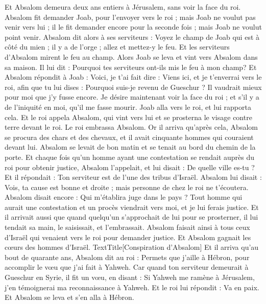 \begin{multicols}{2}
Et Absalom demeura deux ans entiers à Jérusalem, sans voir la face du roi.
Absalom fit demander Joab, pour l'envoyer vers le roi ; mais Joab ne voulut pas venir vers lui ; il le fit demander encore pour la seconde fois ; mais Joab ne voulut point venir.
Absalom dit alors à ses serviteurs : Voyez le champ de Joab qui est à côté du mien ; il y a de l'orge ; allez et mettez-y le feu. Et les serviteurs d'Absalom mirent le feu au champ.
Alors Joab se leva et vint vers Absalom dans sa maison. Il lui dit : Pourquoi tes serviteurs ont-ils mis le feu à mon champ?
Et Absalom répondit à Joab : Voici, je t'ai fait dire : Viens ici, et je t'enverrai vers le roi, afin que tu lui dises : Pourquoi suis-je revenu de Gueschur ? Il vaudrait mieux pour moi que j’y fusse encore. Je désire maintenant voir la face du roi ; et s'il y a de l'iniquité en moi, qu'il me fasse mourir.
Joab alla vers le roi, et lui rapporta cela. Et le roi appela Absalom, qui vint vers lui et se prosterna le visage contre terre devant le roi. Le roi embrassa Absalom.
\VerseOne{}Or il arriva qu’après cela, Absalom se procura des chars et des chevaux, et il avait cinquante hommes qui couraient devant lui.
Absalom se levait de bon matin et se tenait au bord du chemin de la porte. Et chaque fois qu’un homme ayant une contestation se rendait auprès du roi pour obtenir justice, Absalom l'appelait, et lui disait : De quelle ville es-tu ? Et il répondait : Ton serviteur est de l’une des tribus d'Israël.
Absalom lui disait : Vois, ta cause est bonne et droite ; mais personne de chez le roi ne t’écoutera.
Absalom disait encore : Qui m’établira juge dans le pays ? Tout homme qui aurait une contestation et un procès viendrait vers moi, et je lui ferais justice.
Et il arrivait aussi que quand quelqu'un s'approchait de lui pour se prosterner, il lui tendait sa main, le saisissait, et l’embrassait.
Absalom faisait ainsi à tous ceux d'Israël qui venaient vers le roi pour demander justice. Et Absalom gagnait les cœurs des hommes d'Israël.
TextTitle{[Conspiration d'Absalom]}
Et il arriva qu’au bout de quarante ans, Absalom dit au roi : Permets que j’aille à Hébron, pour accomplir le vœu que j'ai fait à Yahweh.
Car quand ton serviteur demeurait à Gueschur en Syrie, il fit un vœu, en disant : Si Yahweh me ramène à Jérusalem, j’en témoignerai ma reconnaissance à Yahweh.
Et le roi lui répondit : Va en paix. Et Absalom se leva et s'en alla à Hébron.

\end{multicols}
